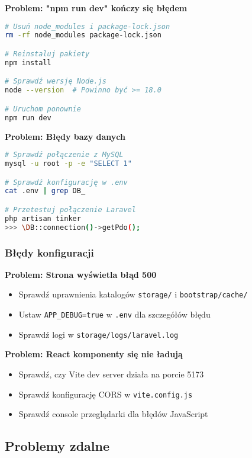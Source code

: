 \documentclass[12pt,a4paper]{article}
\begin{document}
    \textbf{Problem: "npm run dev" kończy się błędem}
    \begin{lstlisting}[language=bash]
# Usuń node_modules i package-lock.json
rm -rf node_modules package-lock.json

# Reinstaluj pakiety
npm install

# Sprawdź wersję Node.js
node --version  # Powinno być >= 18.0

# Uruchom ponownie
npm run dev
    \end{lstlisting}

    \textbf{Problem: Błędy bazy danych}
    \begin{lstlisting}[language=bash]
# Sprawdź połączenie z MySQL
mysql -u root -p -e "SELECT 1"

# Sprawdź konfigurację w .env
cat .env | grep DB_

# Przetestuj połączenie Laravel
php artisan tinker
>>> \DB::connection()->getPdo();
    \end{lstlisting}

    \subsubsection{Błędy konfiguracji}

    \textbf{Problem: Strona wyświetla błąd 500}
    \begin{itemize}
        \item Sprawdź uprawnienia katalogów \texttt{storage/} i \texttt{bootstrap/cache/}
        \item Ustaw \texttt{APP\_DEBUG=true} w \texttt{.env} dla szczegółów błędu
        \item Sprawdź logi w \texttt{storage/logs/laravel.log}
    \end{itemize}

    \textbf{Problem: React komponenty się nie ładują}
    \begin{itemize}
        \item Sprawdź, czy Vite dev server działa na porcie 5173
        \item Sprawdź konfigurację CORS w \texttt{vite.config.js}
        \item Sprawdź console przeglądarki dla błędów JavaScript
    \end{itemize}

    \subsection{Problemy zdalne}
\end{document}
